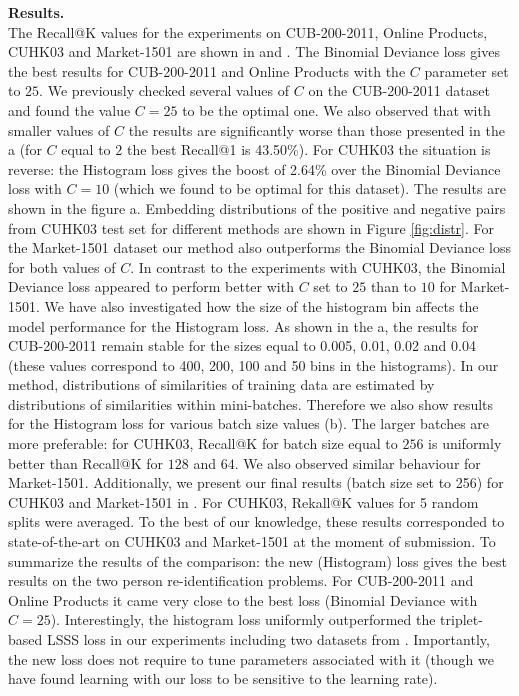 \noindent\textbf{Results.}\\
The Recall@K values for the experiments on CUB-200-2011, Online Products, CUHK03 and Market-1501 are shown in  and . The Binomial Deviance loss  gives the best results for CUB-200-2011 and Online Products with the $C$ parameter set to $25$. We previously checked several values of $C$ on the CUB-200-2011 dataset and found the value $C=25$ to be the optimal one. We also observed that with smaller values of $C$ the results are significantly worse than those presented in the a (for $C$ equal to $2$ the best Recall@1 is 43.50\%). For CUHK03 the situation is reverse: the Histogram loss gives the boost of 2.64\% over the Binomial Deviance loss with $C=10$ (which we found to be optimal for this dataset). The results are shown in the figure a. Embedding distributions of the positive and negative pairs from CUHK03 test set for different methods are shown in Figure  \ref{fig:distr}.
For the Market-1501 dataset our method also outperforms the Binomial Deviance loss for both values of $C$. In contrast to the experiments with CUHK03, the Binomial Deviance loss appeared to perform better with $C$ set to $25$ than to $10$ for Market-1501. We have also investigated how the size of the histogram bin affects the model performance for the Histogram loss. As shown in the a, the results for CUB-200-2011 remain stable for the sizes equal to 0.005, 0.01, 0.02 and 0.04 (these values correspond to 400, 200, 100 and 50 bins in the histograms). In our method,  distributions of similarities of training data are estimated by distributions of similarities within mini-batches. Therefore we also show results for the Histogram loss for various batch size values (b). The larger batches are more preferable: for CUHK03, Recall@K for batch size equal to $256$ is uniformly better than Recall@K for $128$ and $64$. We also observed similar behaviour for Market-1501. Additionally, we present our final results (batch size set to 256) for CUHK03 and Market-1501 in . For CUHK03, Rekall@K values for 5 random splits were averaged. To the best of our knowledge, these results corresponded to state-of-the-art on CUHK03 and Market-1501 at the moment of submission. 
To summarize the results of the comparison: the new (Histogram) loss gives the best results on the two person re-identification problems. For CUB-200-2011 and Online Products it came very close to the best loss (Binomial Deviance with $C=25$). Interestingly, the histogram loss uniformly outperformed the triplet-based LSSS loss  \citep{Song16} in our experiments including two datasets from \citep{Song16}. Importantly, the new loss does not require to tune parameters associated with it (though we have found learning with our loss to be sensitive to the learning rate).








